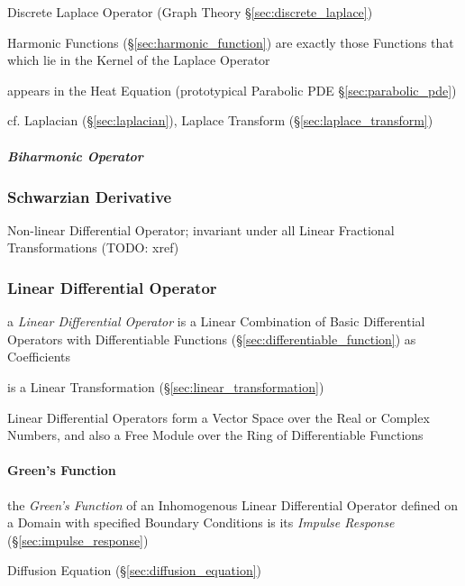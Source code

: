 {Discrete Laplace Operator (Graph Theory \S\ref{sec:discrete_laplace})

Harmonic Functions (\S\ref{sec:harmonic_function}) are exactly those Functions
that which lie in the Kernel of the Laplace Operator

appears in the Heat Equation (prototypical Parabolic PDE
\S\ref{sec:parabolic_pde})

\fist cf. Laplacian (\S\ref{sec:laplacian}), Laplace Transform
(\S\ref{sec:laplace_transform})



\subparagraph{Biharmonic Operator}\label{sec:biharmonic_operator}\hfill



\subsubsection{Schwarzian Derivative}\label{sec:schwarzian_derivative}

Non-linear Differential Operator; invariant under all Linear Fractional
Transformations (TODO: xref)



\subsubsection{Linear Differential Operator}
\label{sec:linear_differential_operator}

a \emph{Linear Differential Operator} is a Linear Combination of Basic
Differential Operators with Differentiable Functions
(\S\ref{sec:differentiable_function}) as Coefficients

is a Linear Transformation (\S\ref{sec:linear_transformation})

Linear Differential Operators form a Vector Space over the Real or Complex
Numbers, and also a Free Module over the Ring of Differentiable Functions



\paragraph{Green's Function}\label{sec:greens_function}\hfill

the \emph{Green's Function} of an Inhomogenous Linear Differential Operator
defined on a Domain with specified Boundary Conditions is its \emph{Impulse
  Response} (\S\ref{sec:impulse_response})

\fist Diffusion Equation (\S\ref{sec:diffusion_equation})

}

